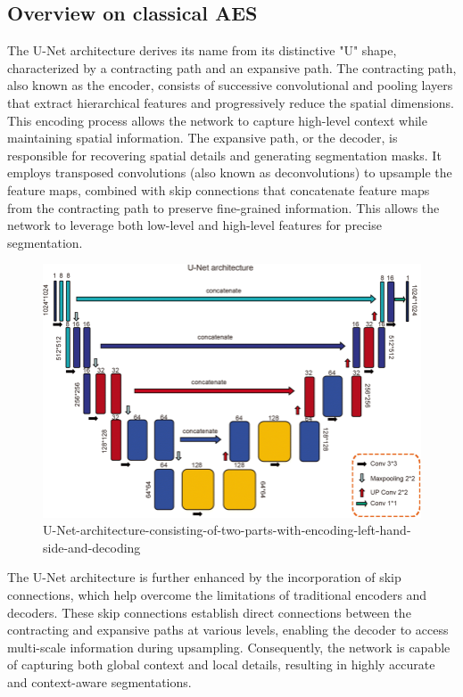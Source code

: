 \documentclass[conference]{IEEEtran}
\begin{document}
\subsection{Overview on classical AES}
The U-Net architecture derives its name from its distinctive "U" shape, characterized by a contracting path and an expansive path. The contracting path, also known as the encoder, consists of successive convolutional and pooling layers that extract hierarchical features and progressively reduce the spatial dimensions. This encoding process allows the network to capture high-level context while maintaining spatial information.
The expansive path, or the decoder, is responsible for recovering spatial details and generating segmentation masks. It employs transposed convolutions (also known as deconvolutions) to upsample the feature maps, combined with skip connections that concatenate feature maps from the contracting path to preserve fine-grained information. This allows the network to leverage both low-level and high-level features for precise segmentation.

\begin{figure}[]

\includegraphics[scale = .3]{U-Net-architecture-consisting-of-two-parts-with-encoding-left-hand-side-and-decoding.png}
\caption{U-Net-architecture-consisting-of-two-parts-with-encoding-left-hand-side-and-decoding}
\label{fig .1}
\end{figure}


The U-Net architecture is further enhanced by the incorporation of skip connections, which help overcome the limitations of traditional encoders and decoders. These skip connections establish direct connections between the contracting and expansive paths at various levels, enabling the decoder to access multi-scale information during upsampling. Consequently, the network is capable of capturing both global context and local details, resulting in highly accurate and context-aware segmentations.
\end{document}

